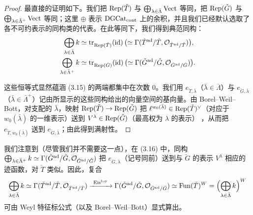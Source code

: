 \begin{proof}
最直接的证明如下。我们把 $\mathrm{Rep}(\check T)$ 与 $\bigoplus_{\lambda\in\bar\Lambda}\mathrm{Vect}$ 等同，把 $\mathrm{Rep}(\check G)$ 与 $\bigoplus_{\lambda\in\bar\Lambda^+}\mathrm{Vect}$ 等同；这里 $\oplus$ 表示 $\mathrm{DGCat}_{\mathrm{cont}}$ 上的余积，并且我们已经默认选取了各不可约表示的同构类的代表。在此等同下，我们得到典范同构：
\begin{equation}
\begin{aligned}
  \bigoplus_{\lambda\in\bar\Lambda}k
  &\simeq \operatorname{tr}_{\mathrm{Rep}(\check T)}(\operatorname{id})\,
    \bigl(\simeq\Gamma(\check T^{\mathrm{ad}}/\check T,\mathcal{O}_{\check T^{\mathrm{ad}}/\check T})\bigr),\\
  \bigoplus_{\lambda\in\bar\Lambda^+}k
  &\simeq \operatorname{tr}_{\mathrm{Rep}(\check G)}(\operatorname{id})\,
    \bigl(\simeq\Gamma(\check G^{\mathrm{ad}}/\check G,\mathcal{O}_{\check G^{\mathrm{ad}}/\check G})\bigr).
\end{aligned}
\end{equation}

这些恒等式显然蕴涵 (3.15) 的两端都集中在次数 $0$。我们用 $e_{\check T,\bar\lambda}$（$\bar\lambda\in\bar\Lambda$）与 $e_{\check G,\bar\lambda}$（$\bar\lambda\in\bar\Lambda^+$）记由所显示的这些同构给出的向量空间的基向量。由 Borel--Weil--Bott，对支配的 $\bar\lambda$，映射 $\mathrm{Rep}(\check T)\to\mathrm{Rep}(\check G)$ 把 $\ell^{w_0(\bar\lambda)}\in\mathrm{Rep}(\check T)^{\vee}$（对应于 $w_0(\bar\lambda)$ 的一维表示）送到 $V^{\lambda}\in\mathrm{Rep}(\check G)$（最高权为 $\lambda$ 的表示）%
，从而把 $e_{\check T,w_0(\bar\lambda)}$ 送到 $e_{\check G,\bar\lambda}$；由此得到满射性。
\end{proof}

\begin{remark}
我们注意到（尽管我们并不需要这一点），在 (3.16) 中，同构 $\bigoplus_{\lambda\in\bar\Lambda^+}k\simeq\Gamma(\check G^{\mathrm{ad}}/\check G,\mathcal{O}_{\check G^{\mathrm{ad}}/\check G})$ 把 $e_{\check G,\bar\lambda}$（记号同前）送到与 $\check G$ 的表示 $V^{\lambda}$ 相应的迹函数，对 $\check T$ 类似。因此，复合
\[
  \bigoplus_{\lambda\in\bar\Lambda}k
  \simeq \Gamma(\check T^{\mathrm{ad}}/\check T,\mathcal{O}_{\check T^{\mathrm{ad}}/\check T})
  \xrightarrow{\ \mathrm{Eis}^{\mathrm{toy}}\ }
  \Gamma(\check G^{\mathrm{ad}}/\check G,\mathcal{O}_{\check G^{\mathrm{ad}}/\check G})
  \simeq \mathrm{Fun}(\check T)^{W}
  = \Bigl(\bigoplus_{\lambda\in\bar\Lambda}k\Bigr)^{W}
\]
可由 Weyl 特征标公式（以及 Borel--Weil--Bott）显式算出。
\end{remark}


